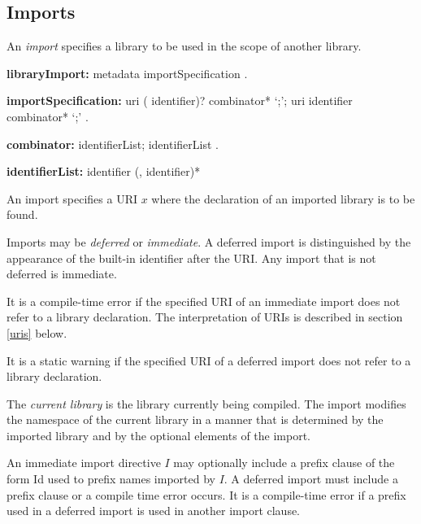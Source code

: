 \documentclass{article}
\newcommand{\code}[1]{{\sf #1}}
\begin{document}
\subsection{Imports}

\LMHash{}
An {\em import} specifies a library to be used in the scope of another library. 
\begin{grammar}
{\bf libraryImport:}
   metadata importSpecification
    .
 
 {\bf importSpecification:}
    \IMPORT{}  uri (\AS{} identifier)?  combinator* `{\escapegrammar ;}';
     \IMPORT{}  uri \DEFERRED{} \AS{} identifier  combinator* `{\escapegrammar ;}'
    .
       
{\bf combinator:}\SHOW{} identifierList;
\HIDE{} identifierList
    .
    
    {\bf identifierList:}
      identifier (, identifier)*
 \end{grammar}
 

\LMHash{}
An import specifies a URI $x$ where the declaration of an imported library is to be found. 

\LMHash{}
Imports may be {\em deferred} or {\em immediate}. A deferred import is distinguished by the appearance of the built-in identifier \DEFERRED{} after the URI. Any import that is not deferred is immediate.

\LMHash{}
It is a compile-time error if  the specified URI of an immediate import does not refer to a library declaration.  The interpretation of URIs is described in section \ref{uris} below.

\LMHash{}
It is a static warning if the specified URI of a deferred import does not refer to a library declaration.


 
\LMHash{}
The {\em current library} is the library currently being compiled. The import modifies the  namespace of the current library in a manner that is determined by the imported library and by the optional elements of  the import.
     
\LMHash{}
An immediate import directive $I$ may optionally include a prefix clause of the form \AS{} \code{Id} used to prefix names imported by $I$. A deferred import must include a prefix clause or a compile time error occurs. It is a compile-time error if a prefix used in a deferred import is used in another import clause.
\end{document}
